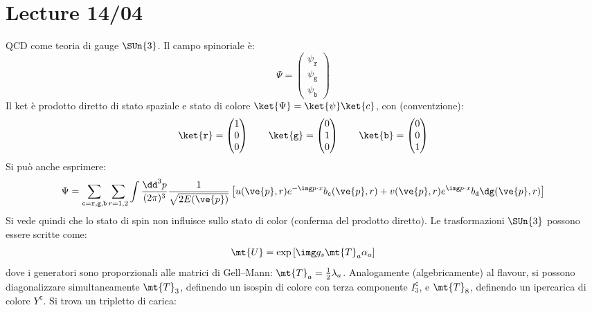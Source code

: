 
\chapter{Lecture 14/04}

QCD come teoria di gauge $ \SUn{3} $. Il campo spinoriale è:
\begin{equation*}
  \Psi =
  \begin{pmatrix}
    \psi_\mathtt{r} \\ \psi_\mathtt{g} \\ \psi_\mathtt{b}
  \end{pmatrix}
\end{equation*}
Il ket è prodotto diretto di stato spaziale e stato di colore $ \ket{\Psi} = \ket{\psi} \ket{c} $, con (conventzione):
\begin{equation}
  \ket{\mathtt{r}} =
  \begin{pmatrix}
    1 \\ 0 \\ 0
  \end{pmatrix}
  \qquad
  \ket{\mathtt{g}} =
  \begin{pmatrix}
    0 \\ 1 \\ 0
  \end{pmatrix}
  \qquad
  \ket{\mathtt{b}} =
  \begin{pmatrix}
    0 \\ 0 \\ 1
  \end{pmatrix}
  \label{eq:su3-rappr}
\end{equation}
Si può anche esprimere:
\begin{equation}
  \Psi = \sum_{\mathtt{c} = \mathtt{r},\mathtt{g},\mathtt{b}} \sum_{r = 1,2} \int \frac{\dd^3 p}{(2\pi)^3} \frac{1}{\sqrt{2E(\ve{p})}} \left[ u(\ve{p},r) e^{-\img p \cdot x} b_\mathtt{c}(\ve{p},r) + v(\ve{p},r) e^{\img p \cdot x} b_\mathtt{d}\dg(\ve{p},r) \right]
\end{equation}
Si vede quindi che lo stato di spin non influisce sullo stato di color (conferma del prodotto diretto). Le trasformazioni $ \SUn{3} $ possono essere scritte come:
\begin{equation}
  \mt{U} = \exp \left[ \img g_s \mt{T}_a \alpha_a \right]
\end{equation}
dove i generatori sono proporzionali alle matrici di Gell--Mann: $ \mt{T}_a = \frac{1}{2} \lambda_a $. Analogamente (algebricamente) al flavour, si possono diagonalizzare simultaneamente $ \mt{T}_3 $, definendo un isospin di colore con terza componente $ I_3^\mathtt{c} $, e $ \mt{T}_8 $, definendo un ipercarica di colore $ Y^\mathtt{c} $. Si trova un tripletto di carica:

